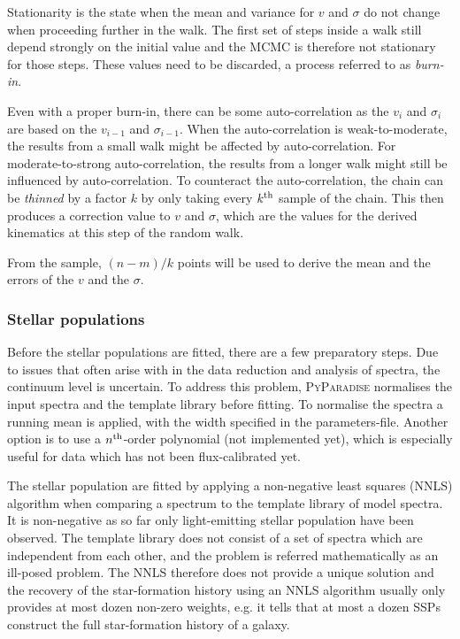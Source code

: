 \documentclass[usenatbib,usegraphicx,useAMS,onecolumn]{mn2e}
\begin{document}
Stationarity is the state when the mean and variance for $v$ and $\sigma$ do not change when proceeding further in the walk.
The first set of steps inside a walk still depend strongly on the initial value and the MCMC is therefore not stationary for those steps.
These values need to be discarded, a process referred to as \textit{burn-in}.

Even with a proper burn-in, there can be some auto-correlation as the $v_i$ and $\sigma_i$ are based on the $v_{i-1}$ and $\sigma_{i-1}$.
When the auto-correlation is weak-to-moderate, the results from a small walk might be affected by auto-correlation.
For moderate-to-strong auto-correlation, the results from a longer walk might still be influenced by auto-correlation.
To counteract the auto-correlation, the chain can be \textit{thinned} by a factor $k$ by only taking every $k^{\rm th}$ sample of the chain.
This then produces a correction value to $v$ and $\sigma$, which are the values for the derived kinematics at this step of the random walk.

From the sample, $(n - m) / k$ points will be used to derive the mean and the errors of the $v$ and the $\sigma$.

\subsubsection{Stellar populations}
\label{subsec:ssp_ssp}
Before the stellar populations are fitted, there are a few preparatory steps.
Due to issues that often arise with in the data reduction and analysis of spectra, the continuum level is uncertain.
To address this problem, \textsc{PyParadise} normalises the input spectra and the template library before fitting.
To normalise the spectra a running mean is applied, with the width specified in the parameters-file.
Another option is to use a $n^{\rm th}$-order polynomial (not implemented yet), which is especially useful for data which has not been flux-calibrated yet.

The stellar population are fitted by applying a non-negative least squares (NNLS) algorithm when comparing a spectrum to the template library of model spectra.
It is non-negative as so far only light-emitting stellar population have been observed.
The template library does not consist of a set of spectra which are independent from each other, and the problem is referred mathematically as an ill-posed problem.
The NNLS therefore does not provide a unique solution and the recovery of the star-formation history using an NNLS algorithm usually only provides at most dozen non-zero weights, e.g. it tells that at most a dozen SSPs construct the full star-formation history of a galaxy.
\end{document}
